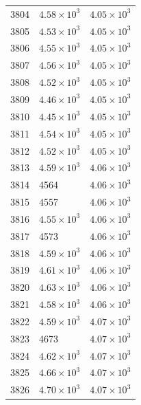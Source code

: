 \begin{table}[H]
\begin{tabular}{lll}
3804 & $\displaystyle 4.58 \times 10^{3}$ & $\displaystyle 4.05 \times 10^{3}$ \\
3805 & $\displaystyle 4.53 \times 10^{3}$ & $\displaystyle 4.05 \times 10^{3}$ \\
3806 & $\displaystyle 4.55 \times 10^{3}$ & $\displaystyle 4.05 \times 10^{3}$ \\
3807 & $\displaystyle 4.56 \times 10^{3}$ & $\displaystyle 4.05 \times 10^{3}$ \\
3808 & $\displaystyle 4.52 \times 10^{3}$ & $\displaystyle 4.05 \times 10^{3}$ \\
3809 & $\displaystyle 4.46 \times 10^{3}$ & $\displaystyle 4.05 \times 10^{3}$ \\
3810 & $\displaystyle 4.45 \times 10^{3}$ & $\displaystyle 4.05 \times 10^{3}$ \\
3811 & $\displaystyle 4.54 \times 10^{3}$ & $\displaystyle 4.05 \times 10^{3}$ \\
3812 & $\displaystyle 4.52 \times 10^{3}$ & $\displaystyle 4.05 \times 10^{3}$ \\
3813 & $\displaystyle 4.59 \times 10^{3}$ & $\displaystyle 4.06 \times 10^{3}$ \\
3814 & 4564 & $\displaystyle 4.06 \times 10^{3}$ \\
3815 & 4557 & $\displaystyle 4.06 \times 10^{3}$ \\
3816 & $\displaystyle 4.55 \times 10^{3}$ & $\displaystyle 4.06 \times 10^{3}$ \\
3817 & 4573 & $\displaystyle 4.06 \times 10^{3}$ \\
3818 & $\displaystyle 4.59 \times 10^{3}$ & $\displaystyle 4.06 \times 10^{3}$ \\
3819 & $\displaystyle 4.61 \times 10^{3}$ & $\displaystyle 4.06 \times 10^{3}$ \\
3820 & $\displaystyle 4.63 \times 10^{3}$ & $\displaystyle 4.06 \times 10^{3}$ \\
3821 & $\displaystyle 4.58 \times 10^{3}$ & $\displaystyle 4.06 \times 10^{3}$ \\
3822 & $\displaystyle 4.59 \times 10^{3}$ & $\displaystyle 4.07 \times 10^{3}$ \\
3823 & 4673 & $\displaystyle 4.07 \times 10^{3}$ \\
3824 & $\displaystyle 4.62 \times 10^{3}$ & $\displaystyle 4.07 \times 10^{3}$ \\
3825 & $\displaystyle 4.66 \times 10^{3}$ & $\displaystyle 4.07 \times 10^{3}$ \\
3826 & $\displaystyle 4.70 \times 10^{3}$ & $\displaystyle 4.07 \times 10^{3}$ \\

\end{tabular}
\end{table}
